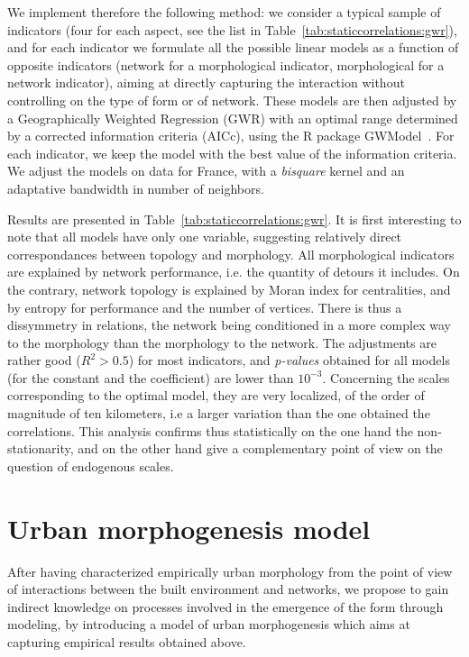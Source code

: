 \documentclass[11pt]{article}
\begin{document}
We implement therefore the following method: we consider a typical sample of indicators (four for each aspect, see the list in Table~\ref{tab:staticcorrelations:gwr}), and for each indicator we formulate all the possible linear models as a function of opposite indicators (network for a morphological indicator, morphological for a network indicator), aiming at directly capturing the interaction without controlling on the type of form or of network. These models are then adjusted by a Geographically Weighted Regression (GWR) with an optimal range determined by a corrected information criteria (AICc), using the R package GWModel~\citep{gollini2013gwmodel}. For each indicator, we keep the model with the best value of the information criteria. We adjust the models on data for France, with a \emph{bisquare} kernel and an adaptative bandwidth in number of neighbors.


Results are presented in Table~\ref{tab:staticcorrelations:gwr}. It is first interesting to note that all models have only one variable, suggesting relatively direct correspondances between topology and morphology. All morphological indicators are explained by network performance, i.e. the quantity of detours it includes. On the contrary, network topology is explained by Moran index for centralities, and by entropy for performance and the number of vertices. There is thus a dissymmetry in relations, the network being conditioned in a more complex way to the morphology than the morphology to the network. The adjustments are rather good ($R^2 > 0.5$) for most indicators, and \emph{p-values} obtained for all models (for the constant and the coefficient) are lower than $10^{-3}$. Concerning the scales corresponding to the optimal model, they are very localized, of the order of magnitude of ten kilometers, i.e a larger variation than the one obtained the correlations. This analysis confirms thus statistically on the one hand the non-stationarity, and on the other hand give a complementary point of view on the question of endogenous scales.









\section{Urban morphogenesis model}

After having characterized empirically urban morphology from the point of view of interactions between the built environment and networks, we propose to gain indirect knowledge on processes involved in the emergence of the form through modeling, by introducing a model of urban morphogenesis which aims at capturing empirical results obtained above.
\end{document}

